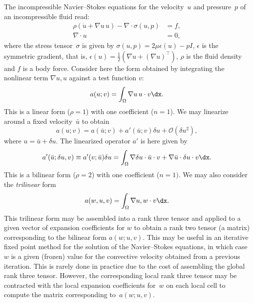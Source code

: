 The incompressible Navier--Stokes equations for the velocity~$u$ and
pressure~$p$ of an incompressible fluid read:
\begin{equation}
  \begin{split}
    \rho(\dot{u} + \nabla u \, u) - \nabla \cdot \sigma(u, p) &= f, \\
    \nabla \cdot u &= 0,
  \end{split}
\end{equation}
where the stress tensor~$\sigma$ is given by $\sigma(u, p) = 2 \mu
\epsilon(u) - p I$, $\epsilon$ is the symmetric gradient, that is,
$\epsilon(u) = \frac{1}{2}(\nabla u + (\nabla u)^{\top})$, $\rho$ is
the fluid density and $f$ is a body force.
Consider here the form obtained by
integrating the nonlinear term $\nabla u , u$ against a test
function $v$:
\begin{equation}
  a(u; v) = \int_{\Omega} \nabla u \, u \cdot v \dx.
\end{equation}
This is a linear form ($\rho = 1$) with one coefficient ($n = 1$). We
may linearize around a fixed velocity~$\bar{u}$ to obtain
\begin{equation}
  a(u; v) = a(\bar{u}; v) + a'(\bar{u}; v) \delta u + \mathcal{O}(\delta u^2),
\end{equation}
where $u = \bar{u} + \delta u$. The linearized operator $a'$ is here
given by
\begin{equation}
  a'(\bar{u}; \delta u, v) \equiv a'(v; \bar{u}) \delta u =
  \int_{\Omega}
  \nabla \delta u \cdot \bar{u} \cdot v +
  \nabla \bar{u} \cdot \delta u \cdot v \dx.
\end{equation}
This is a bilinear form ($\rho = 2$) with one coefficient ($n = 1)$.
We may also consider the \emph{trilinear} form
\begin{equation}
  a(w, u, v) = \int_{\Omega} \nabla u , w \cdot v \dx.
\end{equation}
This trilinear form may be assembled into a rank three tensor and
applied to a given vector of expansion coefficients for $w$ to obtain
a rank two tensor (a matrix) corresponding to the bilinear form $a(w;
u, v)$. This may be useful in an iterative fixed point method for the
solution of the Navier--Stokes equations, in which case $w$ is a given
(frozen) value for the convective velocity obtained from a previous
iteration. This is rarely done in practice due to the cost of
assembling the global rank three tensor. However, the corresponding
local rank three tensor may be contracted with the local expansion
coefficients for~$w$ on each local cell to compute the matrix
corresponding to~$a(w; u, v)$.

